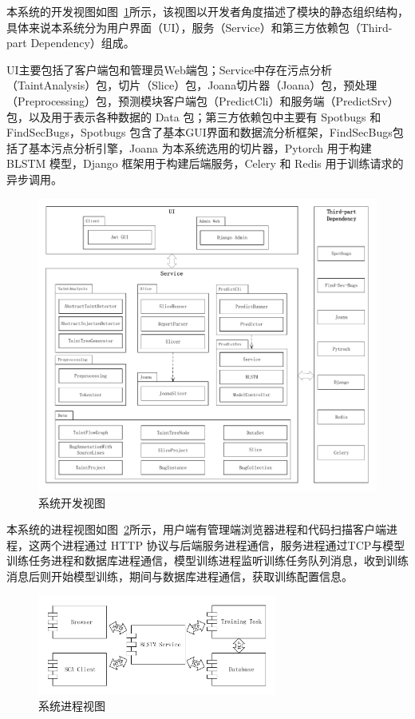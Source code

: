 本系统的开发视图如图~\ref{view:dev}所示，该视图以开发者角度描述了模块的静态组织结构，具体来说本系统分为用户界面（UI），服务（Service）和第三方依赖包（Third-part Dependency）组成。

UI主要包括了客户端包和管理员Web端包；Service中存在污点分析（TaintAnalysis）包，切片（Slice）包，Joana切片器（Joana）包，预处理（Preprocessing）包，预测模块客户端包（PredictCli）和服务端（PredictSrv）包，以及用于表示各种数据的 Data 包；第三方依赖包中主要有 Spotbugs 和 FindSecBugs，Spotbugs 包含了基本GUI界面和数据流分析框架，FindSecBugs包括了基本污点分析引擎，Joana 为本系统选用的切片器，Pytorch 用于构建 BLSTM 模型，Django 框架用于构建后端服务，Celery 和 Redis 用于训练请求的异步调用。

\begin{figure}[!htb]
	\centering
	\includegraphics[width=5in]{FIGs/chapter3/viewdev.pdf}
	\caption{系统开发视图}\label{view:dev}
\end{figure}

本系统的进程视图如图~\ref{view:process}所示，用户端有管理端浏览器进程和代码扫描客户端进程，这两个进程通过 HTTP 协议与后端服务进程通信，服务进程通过TCP与模型训练任务进程和数据库进程通信，模型训练进程监听训练任务队列消息，收到训练消息后则开始模型训练，期间与数据库进程通信，获取训练配置信息。

\begin{figure}[!htb]
	\centering
	\includegraphics[width=0.7\textwidth]{FIGs/chapter3/viewprocess.pdf}
	\caption{系统进程视图}\label{view:process}
\end{figure}

